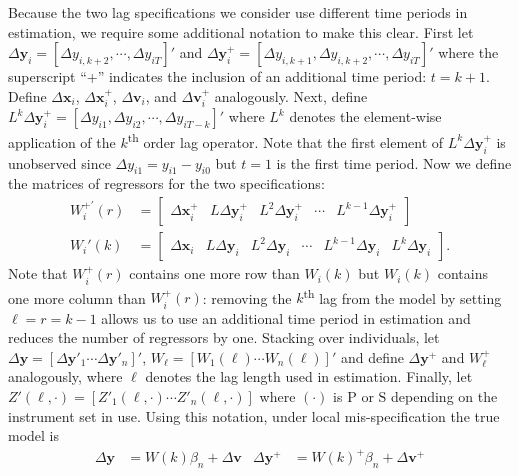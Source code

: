 Because the two lag specifications we consider use different time periods in estimation, we require some additional notation to make this clear. 
First let
$\Delta \mathbf{y}_{i} = [\Delta y_{i,k+2}, \cdots, \Delta y_{iT}]'$ and $\Delta \mathbf{y}^+_{i} = [\Delta y_{i,k+1}, \Delta y_{i,k+2}, \cdots, \Delta y_{iT}]'$ 
where the superscript ``+'' indicates the inclusion of an additional time period: $t = k+1$.
Define $\Delta \mathbf{x}_i$, $\Delta \mathbf{x}_{i}^{+}$, $\Delta \mathbf{v}_i$, and $\Delta \mathbf{v}_{i}^{+}$ analogously.
Next, define $L^k\Delta \mathbf{y}_i^{+} = [\Delta y_{i1}, \Delta y_{i2}, \cdots, \Delta y_{iT-k}]'$ where $L^k$ denotes the element-wise application of the $k$\textsuperscript{th} order lag operator.
Note that the first element of $L^k\Delta \mathbf{y}_{i}^{+}$ is unobserved since $\Delta y_{i1} = y_{i1} - y_{i0}$ but $t=1$ is the first time period.
Now we define the matrices of regressors for the two specifications: 
\begin{align*}
  W_i^{+'}(r) &= \left[
  \begin{array}{ccccc}
    \Delta \mathbf{x}_i^+ & L \Delta \mathbf{y}_i^{+} &  L^2 \Delta \mathbf{y}_i^{+} & \cdots & L^{k-1}\Delta \mathbf{y}_i^{+} 
  \end{array}
\right]\\
  W_i'(k) &= \left[
  \begin{array}{cccccc}
    \Delta \mathbf{x}_i & L \Delta \mathbf{y}_i &  L^2 \Delta \mathbf{y}_i & \cdots & L^{k-1}\Delta \mathbf{y}_i & L^k\Delta \mathbf{y}_i 
  \end{array}
\right].
\end{align*}
Note that $W_i^{+}(r)$ contains one more row than $W_i(k)$ but $W_i(k)$ contains one more column than $W_i^{+}(r)$: removing the $k$\textsuperscript{th} lag from the model by setting $\ell = r = k-1$ allows us to use an additional time period in estimation and reduces the number of regressors by one. 
Stacking over individuals, let $\Delta \mathbf{y} = [\Delta \mathbf{y}'_1 \cdots \Delta \mathbf{y}'_n]'$, $W_\ell = [W_1(\ell) \cdots W_n(\ell)]'$ and define $\Delta \mathbf{y}^{+}$ and $W_\ell^{+}$ analogously, where $\ell$ denotes the lag length used in estimation.
Finally, let $Z'(\ell,\cdot) = [Z'_1(\ell,\cdot) \cdots Z'_n(\ell,\cdot)]$ where $(\cdot)$ is $\text{P}$ or $\text{S}$ depending on the instrument set in use.
Using this notation, under local mis-specification the true model is
\begin{align}
  \Delta \mathbf{y} &= W(k)\beta_n + \Delta \mathbf{v} &  \Delta \mathbf{y}^{+} &= W(k)^{+}\beta_n + \Delta \mathbf{v}^+
\end{align}
